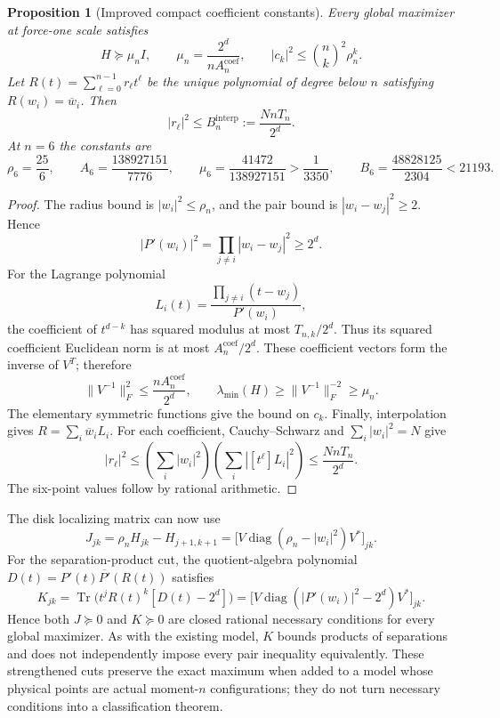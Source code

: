 \documentclass[11pt]{article}
\newtheorem{proposition}[theorem]{Proposition}
\theoremstyle{remark}
\numberwithin{equation}{section}
\begin{document}
\begin{proposition}[Improved compact coefficient constants]\label{prop:trace-new}
Every global maximizer at force-one scale satisfies
\begin{equation}\label{eq:trace-new}
 H\succeq\mu_n I,\qquad
 \mu_n=\frac{2^d}{nA_n^{\mathrm{coef}}},\qquad
 |c_k|^2\le\binom nk^2\rho_n^k.
\end{equation}
Let $R(t)=\sum_{\ell=0}^{n-1}r_\ell t^\ell$ be the unique polynomial
of degree below $n$ satisfying $R(w_i)=\overline w_i$. Then
\begin{equation}\label{eq:conjugation-coeff-new}
 |r_\ell|^2\le B_n^{\mathrm{interp}}:=\frac{NnT_n}{2^d}.
\end{equation}
At $n=6$ the constants are
\[
 \rho_6=\frac{25}6,\qquad A_6=\frac{138927151}{7776},\qquad
 \mu_6=\frac{41472}{138927151}>\frac1{3350},\qquad
 B_6=\frac{48828125}{2304}<21193.
\]
\end{proposition}
\begin{proof}
The radius bound is $|w_i|^2\le\rho_n$, and the pair bound is
$|w_i-w_j|^2\ge2$. Hence
\[
 |P'(w_i)|^2=\prod_{j\ne i}|w_i-w_j|^2\ge2^d.
\]
For the Lagrange polynomial
\[
 L_i(t)=\frac{\prod_{j\ne i}(t-w_j)}{P'(w_i)},
\]
the coefficient of $t^{d-k}$ has squared modulus at most
$T_{n,k}/2^d$. Thus its squared coefficient Euclidean norm is at most
$A_n^{\mathrm{coef}}/2^d$. These coefficient vectors form the inverse of $V^T$;
therefore
\[
 \|V^{-1}\|_F^2\le\frac{nA_n^{\mathrm{coef}}}{2^d},\qquad
 \lambda_{\min}(H)\ge\|V^{-1}\|_F^{-2}\ge\mu_n.
\]
The elementary symmetric functions give the bound on $c_k$.
Finally, interpolation gives $R=\sum_i\overline w_i L_i$.
For each coefficient, Cauchy--Schwarz and $\sum_i|w_i|^2=N$ give
\[
 |r_\ell|^2\le
 \left(\sum_i|w_i|^2\right)
 \left(\sum_i|[t^\ell]L_i|^2\right)
 \le\frac{NnT_n}{2^d}.
\]
The six-point values follow by rational arithmetic.
\end{proof}

The disk localizing matrix can now use
\[
 J_{jk}=\rho_n H_{jk}-H_{j+1,k+1}
       =\bigl[V\operatorname{diag}(\rho_n-|w_i|^2)V^*\bigr]_{jk}.
\]
For the separation-product cut, the quotient-algebra polynomial
$D(t)=P'(t)\overline{P'}(R(t))$ satisfies
\[
 K_{jk}=\operatorname{Tr}\bigl(t^jR(t)^k[D(t)-2^d]\bigr)
       =\bigl[V\operatorname{diag}(|P'(w_i)|^2-2^d)V^*\bigr]_{jk}.
\]
Hence both $J\succeq0$ and $K\succeq0$ are closed rational necessary
conditions for every global maximizer. As with the existing model,
$K$ bounds products of separations and does not independently impose
every pair inequality equivalently. These strengthened cuts preserve
the exact maximum when added to a model whose physical points are
actual moment-$n$ configurations; they do not turn necessary conditions
into a classification theorem.
\end{document}
